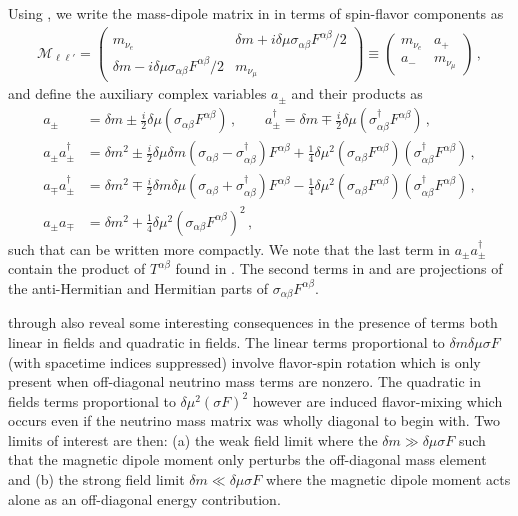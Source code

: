Using , we write the mass-dipole matrix in  in terms of spin-flavor components as
\begin{align}
	\label{mix:2a}
    \mathcal{M}_{\ell\ell'} = 
	\begin{pmatrix}
		m_{\nu_{e}} & {\delta m}+i\delta\mu\sigma_{\alpha\beta}F^{\alpha\beta}/2\\
		{\delta m}-i\delta\mu\sigma_{\alpha\beta}F^{\alpha\beta}/2 & m_{\nu_{\mu}}
	\end{pmatrix}\equiv
    \begin{pmatrix}
        m_{\nu_{e}} & a_{+}\\
        a_{-} & m_{\nu_{\mu}}
    \end{pmatrix}\,,
\end{align}
and define the auxiliary complex variables $a_{\pm}$ and their products as
\begin{align}
    \label{mix:2b}
    a_{\pm}&={\delta m}\pm \frac{i}{2}\delta\mu(\sigma_{\alpha\beta}F^{\alpha\beta})\,,\qquad
    a_{\pm}^{\dag}={\delta m}\mp\frac{i}{2}\delta\mu(\sigma_{\alpha\beta}^{\dag}F^{\alpha\beta})\,,\\
    \label{mix:2c}
    a_{\pm}a_{\pm}^{\dag}&=\delta m^{2}\pm
    \frac{i}{2}\delta\mu\delta m\left(\sigma_{\alpha\beta}-\sigma_{\alpha\beta}^{\dag}\right)F^{\alpha\beta}+
    \frac{1}{4}\delta\mu^{2}(\sigma_{\alpha\beta}F^{\alpha\beta})(\sigma_{\alpha\beta}^{\dag}F^{\alpha\beta})\,,\\
    \label{mix:2d}
    a_{\mp}a_{\pm}^{\dag}&=\delta m^{2}\mp\frac{i}{2}\delta m\delta\mu\left(\sigma_{\alpha\beta}+\sigma_{\alpha\beta}^{\dag}\right)F^{\alpha\beta}-\frac{1}{4}\delta\mu^{2}(\sigma_{\alpha\beta}F^{\alpha\beta})(\sigma_{\alpha\beta}^{\dag}F^{\alpha\beta})\,,\\
    \label{mix:2e}
    a_{\pm}a_{\mp}&=\delta m^{2} + \frac{1}{4}\delta\mu^{2}(\sigma_{\alpha\beta}F^{\alpha\beta})^{2}\,,
\end{align}
such that  can be written more compactly. We note that the last term in $a_{\pm}a_{\pm}^{\dag}$ contain the product of $T^{\alpha\beta}$ found in . The second terms in  and  are projections of the anti-Hermitian and Hermitian parts of $\sigma_{\alpha\beta}F^{\alpha\beta}$.

 through  also reveal some interesting consequences in the presence of terms both linear in fields and quadratic in fields. The linear terms proportional to $\delta m\delta\mu\sigma F$ (with spacetime indices suppressed) involve flavor-spin rotation which is only present when off-diagonal neutrino mass terms are nonzero. The quadratic in fields terms proportional to $\delta\mu^{2}(\sigma F)^{2}$ however are induced flavor-mixing which occurs even if the neutrino mass matrix was wholly diagonal to begin with. Two limits of interest are then: (a) the weak field limit where the $\delta m\gg\delta\mu\sigma F$ such that the magnetic dipole moment only perturbs the off-diagonal mass element and (b) the strong field limit $\delta m\ll\delta\mu\sigma F$ where the magnetic dipole moment acts alone as an off-diagonal energy contribution.

